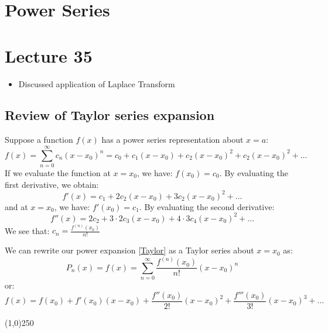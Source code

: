 \chapter{Power Series}
\chapter*{Lecture 35}

\begin{recall}{}{}
\begin{itemize}
\item Discussed application of Laplace Transform 
\end{itemize}
\end{recall}





\section{Review of Taylor series expansion}

Suppose a function $f(x)$ has a power series representation about $x=a$:
\begin{equation}
f(x)=\sum_{n=0}^{\infty}c_{n}(x-x_0)^{n}=c_{0}+c_{1}(x-x_0)+c_{2}(x-x_0)^{2}+c_{2}(x-x_0)^{2}+\hdots
\label{Taylor}
\end{equation}
If we evaluate the function at $x=x_0$, we have: $f(x_0)=c_{0}$.
By evaluating the first derivative, we obtain:
\begin{equation*}
f'(x)=c_{1}+2c_{2}(x-x_0)+3c_{2}(x-x_0)^{2}+\hdots
\end{equation*}
and  at $x=x_0$, we have: $f'(x_0)=c_{1}$.
By evaluating the second derivative:
\begin{equation*}
f''(x)=2c_{2}+3\cdot 2 c_{3}(x-x_0)+4\cdot 3 c_{4}(x-x_0)^{2}+\hdots
\end{equation*}
We see that: $\boxed{c_{n}=\frac{f^{(n)}(x_0)}{n!}}$



We can rewrite our power expansion \eqref{Taylor}  as a Taylor series about $x=x_0$ as:
\begin{equation*}
\boxed{P_n(x)=f(x)=\sum_{n=0}^{\infty}\frac{f^{(n)}(x_0)}{n!}(x-x_0)^{n}}
\end{equation*}
or:
\begin{equation*}
f(x)=f(x_0)+f'(x_0)(x-x_0)+\frac{f''(x_0)}{2!}(x-x_0)^{2}+\frac{f'''(x_0)}{3!}(x-x_0)^{3}+\hdots
\end{equation*}

\begin{center}
\line(1,0){250}
\end{center}

